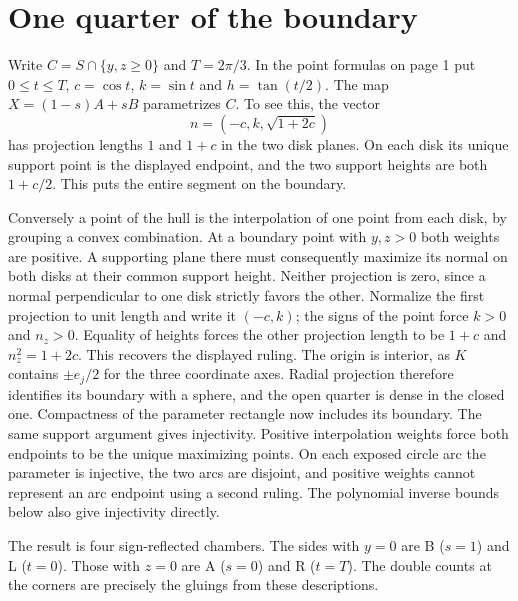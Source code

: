 \documentclass[10pt,letterpaper]{article}
\newcommand{\chapterpage}{\clearpage}
\begin{document}
\chapterpage\section{One quarter of the boundary}
Write $C=S\cap\{y,z\ge0\}$ and $T=2\pi/3$. In the point formulas on page 1 put $0\le t\le T$, $c=\cos t$, $k=\sin t$ and $h=\tan(t/2)$. The map $X=(1-s)A+sB$ parametrizes $C$. To see this, the vector
\[
       n=(-c,k,\sqrt{1+2c})
\]
has projection lengths $1$ and $1+c$ in the two disk planes. On each disk its unique support point is the displayed endpoint, and the two support heights are both $1+c/2$. This puts the entire segment on the boundary.
\par Conversely a point of the hull is the interpolation of one point from each disk, by grouping a convex combination. At a boundary point with $y,z>0$ both weights are positive. A supporting plane there must consequently maximize its normal on both disks at their common support height. Neither projection is zero, since a normal perpendicular to one disk strictly favors the other. Normalize the first projection to unit length and write it $(-c,k)$; the signs of the point force $k>0$ and $n_z>0$. Equality of heights forces the other projection length to be $1+c$ and $n_z^2=1+2c$. This recovers the displayed ruling. The origin is interior, as $K$ contains $\pm e_j/2$ for the three coordinate axes. Radial projection therefore identifies its boundary with a sphere, and the open quarter is dense in the closed one. Compactness of the parameter rectangle now includes its boundary. The same support argument gives injectivity. Positive interpolation weights force both endpoints to be the unique maximizing points. On each exposed circle arc the parameter is injective, the two arcs are disjoint, and positive weights cannot represent an arc endpoint using a second ruling. The polynomial inverse bounds below also give injectivity directly.
\par The result is four sign-reflected chambers. The sides with $y=0$ are B ($s=1$) and L ($t=0$). Those with $z=0$ are A ($s=0$) and R ($t=T$). The double counts at the corners are precisely the gluings from these descriptions.
\end{document}
